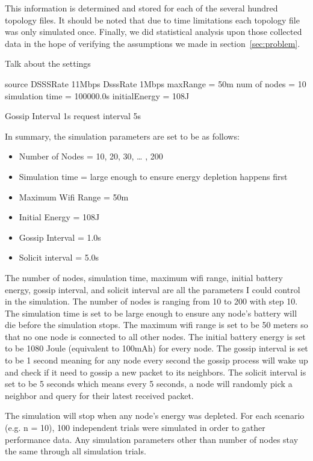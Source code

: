 This information is determined and stored for each of the several hundred topology files. It should be noted that due to time limitations each topology file was only simulated once. Finally, we did statistical analysis upon those collected data in the hope of verifying the assumptions we made in section~\ref{sec:problem}.

Talk about the settings


source DSSSRate 11Mbps
DsssRate 1Mbps
maxRange = 50m
num of nodes = 10
simulation time = 100000.0s
initialEnergy = 108J

Gossip Interval 1s
request interval 5s

In summary, the simulation parameters are set to be as follows:
\begin{itemize}
	\item Number of Nodes = 10, 20, 30, … , 200
	\item Simulation time = large enough to ensure energy depletion happens first
	\item Maximum Wifi Range = 50m
	\item Initial Energy = 108J
	\item Gossip Interval = 1.0s
	\item Solicit interval = 5.0s 
\end{itemize}

The number of nodes, simulation time, maximum wifi range, initial battery energy, gossip interval, and solicit interval are all the parameters I could control in the simulation. The number of nodes is ranging from 10 to 200 with step 10. The simulation time is set to be large enough to ensure any node's battery will die before the simulation stops. The maximum wifi range is set to be 50 meters so that no one node is connected to all other nodes. The initial battery energy is set to be 1080 Joule (equivalent to 100mAh) for every node. The gossip interval is set to be 1 second meaning for any node every second the gossip process will wake up and check if it need to gossip a new packet to its neighbors. The solicit interval is set to be 5 seconds which means every 5 seconds, a node will randomly pick a neighbor and query for their latest received packet. 




The simulation will stop when any node's energy was depleted. For each scenario (e.g. n = 10), 100 independent trials were simulated in order to gather performance data. Any simulation parameters other than number of nodes stay the same through all simulation trials. 


